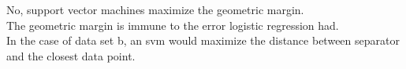 \begin{answer}
    No, support vector machines maximize the geometric margin.\\
    The geometric margin is immune to the error logistic regression had.\\
    In the case of data set b, an svm would maximize the distance between separator and the closest data point.\\
\end{answer}
